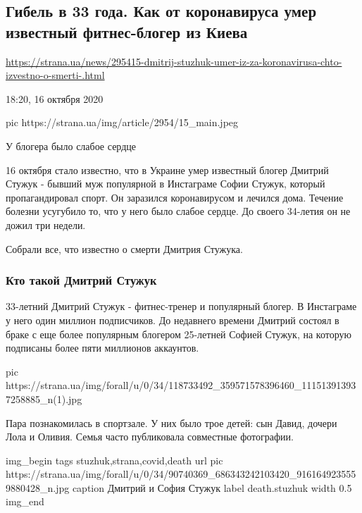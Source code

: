  
 

\subsection{Гибель в 33 года. Как от коронавируса умер известный фитнес-блогер из Киева}
\label{sec:16_10_2020.news.ua.bbc.strana.1_dmitrii_stuzhuk_deat_death}

\url{https://strana.ua/news/295415-dmitrij-stuzhuk-umer-iz-za-koronavirusa-chto-izvestno-o-smerti-.html}

18:20, 16 октября 2020 

\ifcmt
pic https://strana.ua/img/article/2954/15_main.jpeg
\fi

У блогера было слабое сердце

16 октября стало известно, что в Украине умер известный блогер Дмитрий Стужук -
бывший муж популярной в Инстаграме Софии Стужук, который пропагандировал спорт.
Он заразился коронавирусом и лечился дома. Течение болезни усугубило то, что у
него было слабое сердце. До своего 34-летия он не дожил три недели.

Собрали все, что известно о смерти Дмитрия Стужука.

\subsubsection{Кто такой Дмитрий Стужук}

33-летний Дмитрий Стужук - фитнес-тренер и популярный блогер. В Инстаграме у
него один миллион подписчиков. До недавнего времени Дмитрий состоял в браке с
еще более популярным блогером 25-летней Софией Стужук, на которую подписаны
более пяти миллионов аккаунтов.

\ifcmt
pic https://strana.ua/img/forall/u/0/34/118733492_359571578396460_111513913937258885_n(1).jpg
\fi

Пара познакомилась в спортзале. У них было трое детей: сын Давид, дочери Лола и
Оливия. Семья часто публиковала совместные фотографии.

\ifcmt
img_begin 
	tags stuzhuk,strana,covid,death
	url pic https://strana.ua/img/forall/u/0/34/90740369_686343242103420_9161649235559880428_n.jpg
	caption Дмитрий и София Стужук
	label death.stuzhuk
	width 0.5
img_end
\fi


